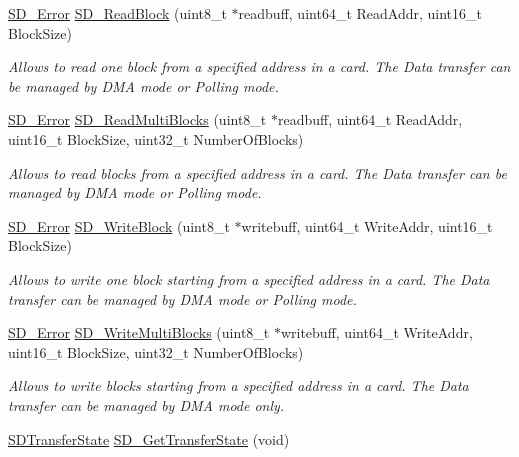 \begin{DoxyCompactItemize}
\hyperlink{group__sd__card_gacff91fa68daa1d1ee967b5b3fb3dbd8c}{S\+D\+\_\+\+Error} \hyperlink{group__sd__card_ga1b2b4c1bf25da0771325b00cd638129d}{S\+D\+\_\+\+Read\+Block} (uint8\+\_\+t $\ast$readbuff, uint64\+\_\+t Read\+Addr, uint16\+\_\+t Block\+Size)
\begin{DoxyCompactList}\small\item\em Allows to read one block from a specified address in a card. The Data transfer can be managed by D\+MA mode or Polling mode. \end{DoxyCompactList}\item 
\hyperlink{group__sd__card_gacff91fa68daa1d1ee967b5b3fb3dbd8c}{S\+D\+\_\+\+Error} \hyperlink{group__sd__card_ga56b7336165f2631d9142a513ea2d0d17}{S\+D\+\_\+\+Read\+Multi\+Blocks} (uint8\+\_\+t $\ast$readbuff, uint64\+\_\+t Read\+Addr, uint16\+\_\+t Block\+Size, uint32\+\_\+t Number\+Of\+Blocks)
\begin{DoxyCompactList}\small\item\em Allows to read blocks from a specified address in a card. The Data transfer can be managed by D\+MA mode or Polling mode. \end{DoxyCompactList}\item 
\hyperlink{group__sd__card_gacff91fa68daa1d1ee967b5b3fb3dbd8c}{S\+D\+\_\+\+Error} \hyperlink{group__sd__card_gab1eef7c1ff23ea746db504463d301a8b}{S\+D\+\_\+\+Write\+Block} (uint8\+\_\+t $\ast$writebuff, uint64\+\_\+t Write\+Addr, uint16\+\_\+t Block\+Size)
\begin{DoxyCompactList}\small\item\em Allows to write one block starting from a specified address in a card. The Data transfer can be managed by D\+MA mode or Polling mode. \end{DoxyCompactList}\item 
\hyperlink{group__sd__card_gacff91fa68daa1d1ee967b5b3fb3dbd8c}{S\+D\+\_\+\+Error} \hyperlink{group__sd__card_ga64baac72a75a2c522e837935009cbe93}{S\+D\+\_\+\+Write\+Multi\+Blocks} (uint8\+\_\+t $\ast$writebuff, uint64\+\_\+t Write\+Addr, uint16\+\_\+t Block\+Size, uint32\+\_\+t Number\+Of\+Blocks)
\begin{DoxyCompactList}\small\item\em Allows to write blocks starting from a specified address in a card. The Data transfer can be managed by D\+MA mode only. \end{DoxyCompactList}\item 
\hyperlink{group__sd__card_gace0484a459648257c3eae8ea60f64fbf}{S\+D\+Transfer\+State} \hyperlink{group__sd__card_ga2dd79455185c28bd21964d113a38d110}{S\+D\+\_\+\+Get\+Transfer\+State} (void)

\end{DoxyCompactItemize}
